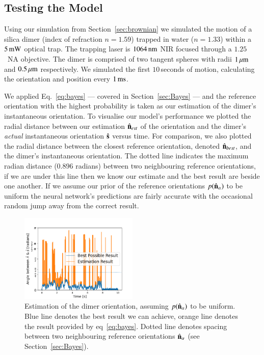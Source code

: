 \documentclass[final,  3p]{elsarticle}
\begin{document}
\subsection{Testing the Model}
\label{sec:test}

Using our simulation from Section~\ref{sec:brownian} we simulated the
motion of a silica dimer (index of refraction $n=1.59$) trapped in
water ($n = 1.33$) within a $5\,{\rm mW}$ optical trap.  The trapping
laser is $1064\,{\rm nm}$ NIR focused through a $1.25$~NA objective.
The dimer is comprised of two tangent spheres with radii
$1\,\mu{\rm m}$ and $0.5\,\mu{\rm m}$ respectively. We simulated the
first $10$\,seconds of motion, calculating the orientation and
position every $1\,{\rm ms}$.

We applied Eq.~\eqref{eq:bayes} --- covered in Section~\ref{sec:Bayes} --- and the reference orientation with the highest probability is taken as our estimation of the dimer's instantaneous orientation. To visualise our model's performance  we plotted the radial distance between our estimation $\hat{\bf n}_{est}$ of the orientation and the dimer's \emph{actual} instantaneous orientation $\hat{\bf s}$ versus time. For comparison, we also plotted the radial distance between the closest reference orientation, denoted $\hat{\bf n}_{best}$, and the dimer's instantaneous orientation. The dotted line indicates the maximum radian distance ($0.896$ radians) between two neighbouring reference orientations, if we are under this line then we know our estimate and the best result are beside one another. If we assume our prior of the reference orientations $p(\hat{\bf n}_\alpha)$ to be uniform the neural network's predictions are fairly accurate with the occasional random jump away from the correct result. 


\begin{figure}[h]
\centering
\includegraphics[width=0.5\textwidth]{./Images/fig3.png}
\caption{\label{fig:uniform}
%
Estimation of the dimer orientation, assuming $p(\hat{\bf n}_\alpha)$
to be uniform. Blue line denotes the best result we can achieve,
orange line denotes the result provided by eq~\ref{eq:bayes}. Dotted
line denotes spacing between two neighbouring
reference orientations $\hat{\bf n}_\alpha$ (see Section~\ref{sec:Bayes}).
%
}
\end{figure} 
\end{document}
